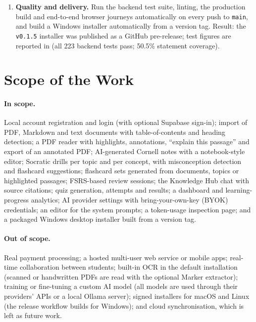 \begin{enumerate}
  (Gemini, OpenAI, Groq and a local Ollama server), switchable at run time, with BYOK keys
  saved from the AI Providers settings encrypted by AES-256-GCM and passwords hashed with PBKDF2-HMAC-SHA256 at
  600{,}000 iterations.
  \item \textbf{Quality and delivery.} Run the backend test suite, linting, the
  production build and end-to-end browser journeys automatically on every push to
  \texttt{main}, and build a Windows installer automatically from a version tag.
  Result: the \texttt{v0.1.5} installer was published as a GitHub pre-release; test figures are reported in
   (all 223 backend tests pass; 50.5\% statement coverage).
\end{enumerate}

\section{Scope of the Work}

\paragraph{In scope.}
Local account registration and login (with optional Supabase sign-in); import of PDF,
Markdown and text documents with table-of-contents and heading detection; a PDF reader
with highlights, annotations, ``explain this passage'' and export of an annotated PDF;
AI-generated Cornell notes with a notebook-style editor; Socratic drills per topic and per
concept, with misconception detection and flashcard suggestions; flashcard sets generated
from documents, topics or highlighted passages; FSRS-based review sessions; the
Knowledge Hub chat with source citations; quiz generation, attempts and results; a
dashboard and learning-progress analytics; AI provider settings with bring-your-own-key
(BYOK) credentials; an editor for the system prompts; a token-usage inspection page; and
a packaged Windows desktop installer built from a version tag.

\paragraph{Out of scope.}
Real payment processing;
a hosted multi-user web service or mobile apps; real-time collaboration between students;
built-in OCR in the default installation (scanned or handwritten PDFs are read with the
optional Marker extractor); training or fine-tuning a custom AI model (all models are used through
their providers' APIs or a local Ollama server); signed installers for macOS and Linux
(the release workflow builds for Windows); and cloud synchronisation, which is left as
future work.

